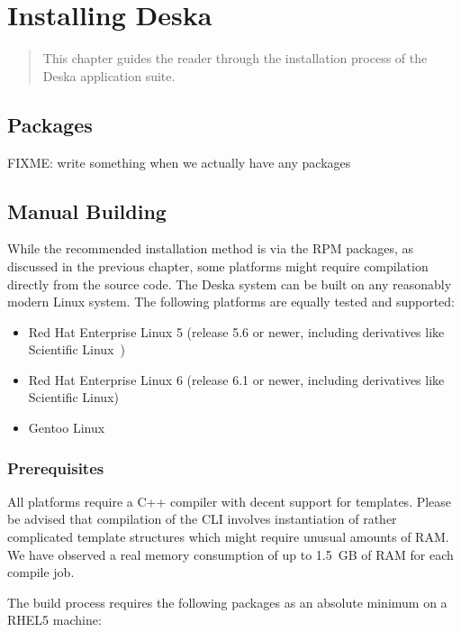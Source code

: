 \documentclass[deska]{subfiles}
\begin{document}
\chapter{Installing Deska}
\label{sec:building}

\begin{abstract}
This chapter guides the reader through the installation process of the Deska application suite.
\end{abstract}

\section{Packages}

FIXME: write something when we actually have any packages

\section{Manual Building}

While the recommended installation method is via the RPM packages, as discussed in the previous chapter, some platforms
might require compilation directly from the source code.  The Deska system can be built on any reasonably modern Linux
system.  The following platforms are equally tested and supported:

\begin{itemize}
    \item Red Hat Enterprise Linux \cite{rhel} 5 (release 5.6 or newer, including derivatives like Scientific
        Linux~\cite{scientific-linux})
    \item Red Hat Enterprise Linux 6 (release 6.1 or newer, including derivatives like Scientific Linux)
    \item Gentoo Linux~\cite{gentoo}
\end{itemize}

\subsection{Prerequisites}

All platforms require a C++ compiler with decent support for templates.  Please be advised that compilation of the CLI
involves instantiation of rather complicated template structures which might require unusual amounts of RAM.  We have
observed a real memory consumption of up to 1.5~GB of RAM for each compile job.

The build process requires the following packages as an absolute minimum on a RHEL5 machine:
\end{document}
